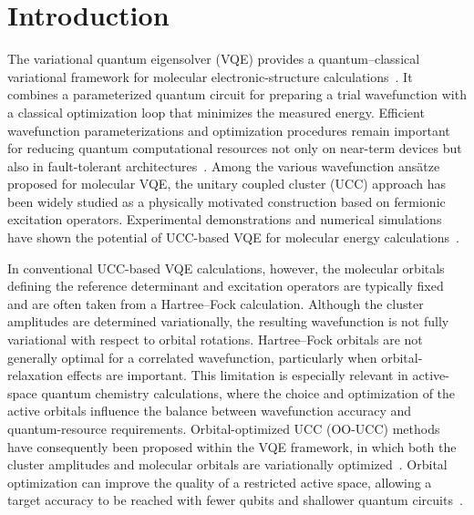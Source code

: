 \documentclass[
 reprint,
 amsmath,amssymb,
 aps,
 physrev,
]{revtex4-2}
\begin{document}
\section{Introduction}
The variational quantum eigensolver (VQE) provides a quantum--classical variational framework for molecular electronic-structure calculations~\cite{peruzzo2014,mcclean2016,omalley2016}.
It combines a parameterized quantum circuit for preparing a trial wavefunction with a classical optimization loop that minimizes the measured energy.
Efficient wavefunction parameterizations and optimization procedures remain important for reducing quantum computational resources not only on near-term devices but also in fault-tolerant architectures~\cite{sayginel2024}.
Among the various wavefunction ans\"atze proposed for molecular VQE, the unitary coupled cluster (UCC) approach has been widely studied as a physically motivated construction based on fermionic excitation operators.
Experimental demonstrations and numerical simulations have shown the potential of UCC-based VQE for molecular energy calculations~\cite{omalley2016,romero2019}.

In conventional UCC-based VQE calculations, however, the molecular orbitals defining the reference determinant and excitation operators are typically fixed and are often taken from a Hartree--Fock calculation. Although the cluster amplitudes are determined variationally, the resulting wavefunction is not fully variational with respect to orbital rotations. Hartree--Fock orbitals are not generally optimal for a correlated wavefunction, particularly when orbital-relaxation effects are important. This limitation is especially relevant in active-space quantum chemistry calculations, where the choice and optimization of the active orbitals influence the balance between wavefunction accuracy and quantum-resource requirements.
Orbital-optimized UCC (OO-UCC) methods have consequently been proposed within the VQE framework, in which both the cluster amplitudes and molecular orbitals are variationally optimized~\cite{mizukami2020}.
Orbital optimization can improve the quality of a restricted active space, allowing a target accuracy to be reached with fewer qubits and shallower quantum circuits~\cite{takeshita2020,mizukami2020}.
\end{document}
